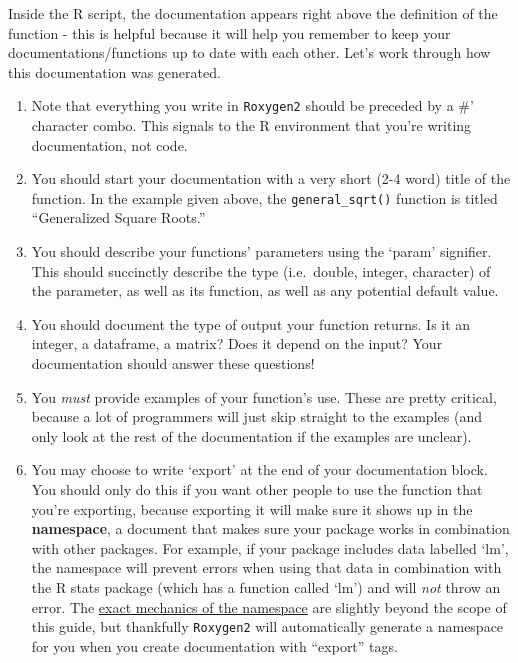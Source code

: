 \documentclass[
]{book}
\begin{document}
Inside the R script, the documentation appears right above the definition of the function - this is helpful because it will help you remember to keep your documentations/functions up to date with each other. Let's work through how this documentation was generated.

\begin{enumerate}
\def\labelenumi{\arabic{enumi}.}
\item
  Note that everything you write in \texttt{Roxygen2} should be preceded by a \#' character combo. This signals to the R environment that you're writing documentation, not code.
\item
  You should start your documentation with a very short (2-4 word) title of the function. In the example given above, the \texttt{general\_sqrt()} function is titled ``Generalized Square Roots.''
\item
  You should describe your functions' parameters using the `param' signifier. This should succinctly describe the type (i.e.~double, integer, character) of the parameter, as well as its function, as well as any potential default value.
\item
  You should document the type of output your function returns. Is it an integer, a dataframe, a matrix? Does it depend on the input? Your documentation should answer these questions!
\item
  You \emph{must} provide examples of your function's use. These are pretty critical, because a lot of programmers will just skip straight to the examples (and only look at the rest of the documentation if the examples are unclear).
\item
  You may choose to write `export' at the end of your documentation block. You should only do this if you want other people to use the function that you're exporting, because exporting it will make sure it shows up in the \textbf{namespace}, a document that makes sure your package works in combination with other packages. For example, if your package includes data labelled `lm', the namespace will prevent errors when using that data in combination with the R stats package (which has a function called `lm') and will \emph{not} throw an error. The \href{http://r-pkgs.had.co.nz/namespace.html}{exact mechanics of the namespace} are slightly beyond the scope of this guide, but thankfully \texttt{Roxygen2} will automatically generate a namespace for you when you create documentation with ``export'' tags.
\end{enumerate}
\end{document}
